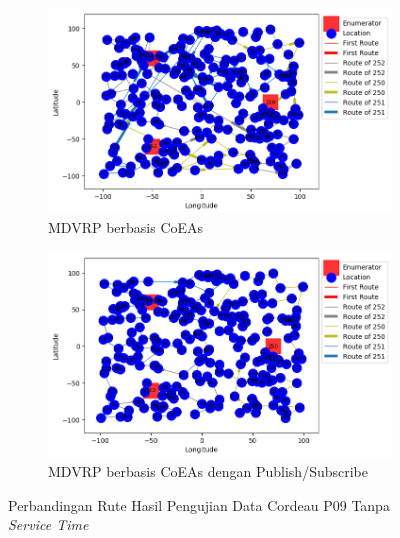 \begin{figure}[!]
	\centering
	\begin{subfigure}[t]{\textwidth}
		\centering
		\includegraphics[width=\textwidth]{Resources/Images/test_result_cordeau_p09_notw_coes}
		\caption{MDVRP berbasis CoEAs}
		\label{fig:test_result_cordeau_p09_notw_coes}
	\end{subfigure}%
	
	\begin{subfigure}[t]{\textwidth}
		\centering
		\includegraphics[width=\textwidth]{Resources/Images/test_result_cordeau_p09_notw_pubsub_coes}
		\caption{MDVRP berbasis CoEAs dengan Publish/Subscribe}
		\label{fig:test_result_cordeau_p09_notw_pubsub_coes}
	\end{subfigure}
	\caption{Perbandingan Rute Hasil Pengujian Data Cordeau P09 Tanpa \textit{Service Time}}
	\label{fig:test_result_cordeau_p09_notw}
\end{figure}


